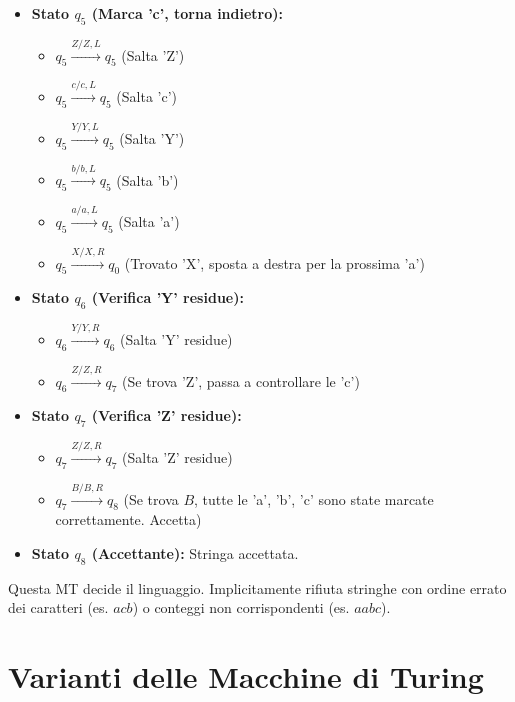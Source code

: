 \documentclass[a4paper, 11pt]{book} %
\theoremstyle{definition}
\begin{document}
\begin{itemize}
\begin{itemize}
        \end{itemize}
    \item \textbf{Stato $q_5$ (Marca 'c', torna indietro):}
        \begin{itemize}
            \item $q_5 \xrightarrow{Z / Z, L} q_5$ (Salta 'Z')
            \item $q_5 \xrightarrow{c / c, L} q_5$ (Salta 'c')
            \item $q_5 \xrightarrow{Y / Y, L} q_5$ (Salta 'Y')
            \item $q_5 \xrightarrow{b / b, L} q_5$ (Salta 'b')
            \item $q_5 \xrightarrow{a / a, L} q_5$ (Salta 'a')
            \item $q_5 \xrightarrow{X / X, R} q_0$ (Trovato 'X', sposta a destra per la prossima 'a')
        \end{itemize}
    \item \textbf{Stato $q_6$ (Verifica 'Y' residue):}
        \begin{itemize}
            \item $q_6 \xrightarrow{Y / Y, R} q_6$ (Salta 'Y' residue)
            \item $q_6 \xrightarrow{Z / Z, R} q_7$ (Se trova 'Z', passa a controllare le 'c')
        \end{itemize}
    \item \textbf{Stato $q_7$ (Verifica 'Z' residue):}
        \begin{itemize}
            \item $q_7 \xrightarrow{Z / Z, R} q_7$ (Salta 'Z' residue)
            \item $q_7 \xrightarrow{B / B, R} q_8$ (Se trova $B$, tutte le 'a', 'b', 'c' sono state marcate correttamente. Accetta)
        \end{itemize}
    \item \textbf{Stato $q_8$ (Accettante):} Stringa accettata.
\end{itemize}
Questa MT decide il linguaggio. Implicitamente rifiuta stringhe con ordine errato dei caratteri (es. $acb$) o conteggi non corrispondenti (es. $aabc$).



\chapter{Varianti delle Macchine di Turing}
\end{document}
